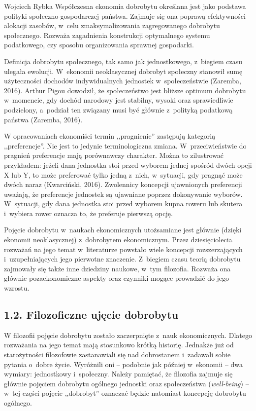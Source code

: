 \begin{artplenv}{Wojciech Rybka}
Współczesna ekonomia dobrobytu określana jest jako podstawa polityki społeczno-gospodarczej państwa. Zajmuje się ona
poprawą efektywności alokacji zasobów, w~celu zmaksymalizowania zagregowanego dobrobytu społecznego. Rozważa
zagadnienia konstrukcji optymalnego systemu podatkowego, czy sposobu organizowania sprawnej gospodarki.

Definicja dobrobytu społecznego, tak samo jak jednostkowego, z~biegiem czasu ulegała ewolucji. W~ekonomii neoklasycznej
dobrobyt społeczny stanowił sumę użyteczności dochodów indywidualnych jednostek w~społeczeństwie
\label{ref:RNDwe0Ev2B4Nk}(Zaremba, 2016). Arthur Pigou dowodził, że społeczeństwo jest bliższe optimum
dobrobytu w~momencie, gdy dochód narodowy jest stabilny, wysoki oraz sprawiedliwie podzielony, a~podział ten związany musi być
głównie z~polityką podatkową państwa \label{ref:RNDGhHYEoBuXe}(Zaremba, 2016).

W opracowaniach ekonomiści termin ,,pragnienie'' zastępują kategorią ,,preferencje''. Nie jest to jedynie terminologiczna
zmiana. W~przeciwieństwie do pragnień preferencje mają porównawczy charakter. Można to zilustrować przykładem: jeżeli
dana jednostka stoi przed wyborem jednej spośród dwóch opcji X lub Y, to może preferować tylko jedną z~nich,
w~sytuacji, gdy pragnąć może dwóch naraz \label{ref:RND68upEwQ8VH}(Kwarciński, 2016). Zwolennicy koncepcji ujawnionych
preferencji uważają, że preferencje jednostek są ujawniane poprzez dokonywanie wyborów. W~sytuacji, gdy dana jednostka
stoi przed wyborem kupna roweru lub skutera i~wybiera rower oznacza to, że preferuje pierwszą opcję. 

Pojęcie dobrobytu w~naukach ekonomicznych utożsamiane jest głównie (dzięki ekonomii neoklasycznej) z~dobrobytem
ekonomicznym. Przez dziesięciolecia rozważań na jego temat w~literaturze powstało wiele koncepcji
rozszerzających i~uzupełniających jego pierwotne znaczenie. Z~biegiem czasu teorią dobrobytu
zajmowały się także inne dziedziny naukowe, w~tym filozofia. Rozważa ona głównie pozaekonomiczne
aspekty oraz czynniki mogące prowadzić do jego wzrostu. 

\subsection{1.2. Filozoficzne ujęcie dobrobytu}
W filozofii pojęcie dobrobytu zostało zaczerpnięte z~nauk ekonomicznych. Dlatego rozważania na jego temat mają
stosunkowo krótką historię. Jednakże już od starożytności filozofowie zastanawiali się nad dobrostanem i~zadawali sobie
pytania o~dobre życie. Wyróżnili oni -- podobnie jak później w~ekonomii -- dwa wymiary: jednostkowy i~społeczny. Należy
pamiętać, że filozofia zajmuje się głównie pojęciem dobrobytu ogólnego jednostki oraz społeczeństwa
(\textit{well-being}) -- w~tej części pojęcie ,,dobrobyt'' oznaczać będzie natomiast koncepcję dobrobytu ogólnego. 


\end{artplenv}
